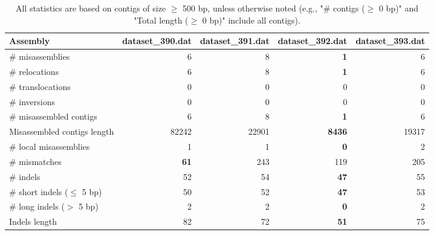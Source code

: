 \documentclass[12pt,a4paper]{article}
\begin{document}
\begin{table}[ht]
\begin{center}
\caption{All statistics are based on contigs of size $\geq$ 500 bp, unless otherwise noted (e.g., "\# contigs ($\geq$ 0 bp)" and "Total length ($\geq$ 0 bp)" include all contigs).}
\begin{tabular}{|l*{4}{|r}|}
\hline
Assembly & dataset\_390.dat & dataset\_391.dat & dataset\_392.dat & dataset\_393.dat \\ \hline
\# misassemblies & 6 & 8 & {\bf 1} & 6 \\ \hline
\hspace{5mm}\# relocations & 6 & 8 & {\bf 1} & 6 \\ \hline
\hspace{5mm}\# translocations & 0 & 0 & 0 & 0 \\ \hline
\hspace{5mm}\# inversions & 0 & 0 & 0 & 0 \\ \hline
\# misassembled contigs & 6 & 8 & {\bf 1} & 6 \\ \hline
Misassembled contigs length & 82242 & 22901 & {\bf 8436} & 19317 \\ \hline
\# local misassemblies & 1 & 1 & {\bf 0} & 2 \\ \hline
\# mismatches & {\bf 61} & 243 & 119 & 205 \\ \hline
\# indels & 52 & 54 & {\bf 47} & 55 \\ \hline
\hspace{5mm}\# short indels ($\leq$ 5 bp) & 50 & 52 & {\bf 47} & 53 \\ \hline
\hspace{5mm}\# long indels ($>$ 5 bp) & 2 & 2 & {\bf 0} & 2 \\ \hline
Indels length & 82 & 72 & {\bf 51} & 75 \\ \hline
\end{tabular}
\end{center}
\end{table}
\end{document}
